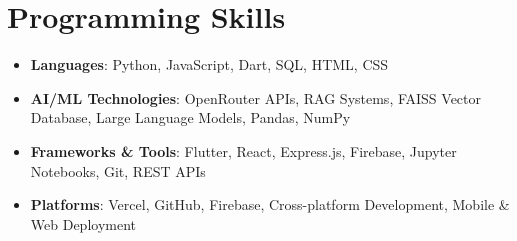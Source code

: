 \documentclass[letterpaper,10pt]{article}
\newcommand{\resumeSubHeadingListStart}{\begin{itemize}[leftmargin=*]}
\newcommand{\resumeSubHeadingListEnd}{\end{itemize}}
\begin{document}
\section*{Programming Skills}
\resumeSubHeadingListStart
  \item{
    \textbf{Languages}{: Python, JavaScript, Dart, SQL, HTML, CSS}
  }
  \item{
    \textbf{AI/ML Technologies}{: OpenRouter APIs, RAG Systems, FAISS Vector Database, Large Language Models, Pandas, NumPy}
  }
  \item{
    \textbf{Frameworks \& Tools}{: Flutter, React, Express.js, Firebase, Jupyter Notebooks, Git, REST APIs}
  }
  \item{
    \textbf{Platforms}{: Vercel, GitHub, Firebase, Cross-platform Development, Mobile \& Web Deployment}
  }
\resumeSubHeadingListEnd
\end{document}
